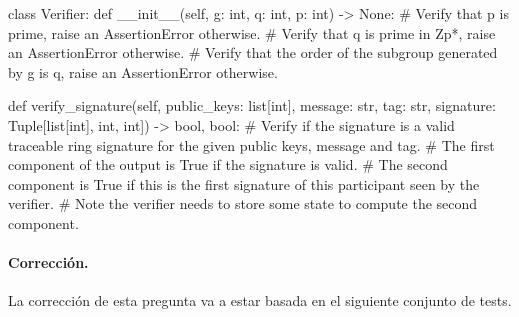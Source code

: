 \begin{python}
class Verifier:
        def __init__(self, g: int, q: int, p: int) -> None:
                # Verify that p is prime, raise an AssertionError otherwise.
                # Verify that q is prime in Zp*, raise an AssertionError otherwise.
                # Verify that the order of the subgroup generated by g is q, raise an AssertionError otherwise.

        def verify_signature(self, public_keys: list[int], message: str, tag: str, signature: Tuple[list[int], int, int]) -> bool, bool:
                # Verify if the signature is a valid traceable ring signature for the given public keys, message and tag.
                # The first component of the output is True if the signature is valid.
                # The second component is True if this is the first signature of this participant seen by the verifier.
                # Note the verifier needs to store some state to compute the second component.
\end{python}

\medskip

\paragraph{Corrección.}
La corrección de esta pregunta va a estar basada en el siguiente conjunto de tests.

